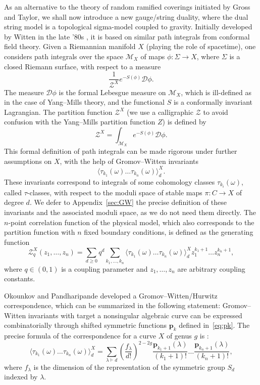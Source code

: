 \documentclass[11pt,a4paper,reqno]{article}
\theoremstyle{definition}
\theoremstyle{remark}
\begin{document}
As an alternative to the theory of random ramified coverings initiated by Gross and Taylor, we shall now introduce a new gauge/string duality, where the dual string model is a topological sigma-model coupled to gravity. Initially developed by Witten in the late '80s \cite{Wit88,Wit91b}, it is based on similar path integrals from conformal field theory. Given a Riemannian manifold $X$ (playing the role of spacetime), one considers path integrals over the space $\mathcal{M}_X$ of maps $\phi:\Sigma\to X$, where $\Sigma$ is a closed Riemann surface, with respect to a measure
\[
\frac{1}{\mathcal{Z}^X}e^{-S(\phi)}\mathcal{D}\phi.
\]
The measure $\mathcal{D}\phi$ is the formal Lebesgue measure on $\mathcal{M}_X$, which is ill-defined as in the case of Yang--Mills theory, and the functional $S$ is a conformally invariant Lagrangian. The partition function $\mathcal{Z}^X$ (we use a calligraphic $\mathcal{Z}$ to avoid confusion with the Yang--Mills partition function $Z$) is defined by
\[
\mathcal{Z}^X=\int_{\mathcal{M}_X}e^{-S(\phi)}\mathcal{D}\phi.
\]
This formal definition of path integrals can be made rigorous under further assumptions on $X$, with the help of Gromov--Witten invariants
\[
\langle\tau_{k_1}(\omega)\ldots\tau_{k_n}(\omega)\rangle_d^X.
\]
These invariants correspond to integrals of some cohomology classes $\tau_{k_i}(\omega)$, called $\tau$-classes, with respect to the moduli space of stable maps $\pi:C\to X$ of degree $d$. We defer to Appendix~\ref{sec:GW} the precise definition of these invariants and the associated moduli space, as we do not need them directly. The $n$-point correlation function of the physical model, which also corresponds to the partition function with $n$ fixed boundary conditions, is defined as the generating function
\begin{equation}\label{eq:GW_PF}
\mathcal{Z}_q^X(z_1,\ldots,z_n)=\sum_{d\geq 0}q^d\sum_{k_1,\ldots,k_n}\langle \tau_{k_1}(\omega)\ldots\tau_{k_n}(\omega)\rangle_d^Xz_1^{k_1+1}\ldots z_n^{k_n+1},
\end{equation}
where $q\in(0,1)$ is a coupling parameter and $z_1,\ldots,z_n$ are arbitrary coupling constants.

Okounkov and Pandharipande developed a  Gromov--Witten/Hurwitz correspondence, which can be summarized in the following statement: Gromov--Witten invariants with target a nonsingular algebraic curve can be expressed combinatorially through shifted symmetric functions $\mathbf p_k$ defined in~\eqref{eq:pk}. The precise formula of the correspondence for a curve $X$ of genus $g$ is \cite[eq. (0.25)]{OP2}:
\begin{equation}\label{eq:GWH_bracket}
\langle\tau_{k_1}(\omega)\ldots\tau_{k_n}(\omega)\rangle_d^X=\sum_{\lambda\vdash d}\left(\frac{f_\lambda}{d!}\right)^{2-2g}\frac{\mathbf{p}_{k_1+1}(\lambda)}{(k_1+1)!}\ldots \frac{\mathbf{p}_{k_n+1}(\lambda)}{(k_n+1)!},
\end{equation}
where $f_\lambda$ is the dimension of the representation of the symmetric group $S_d$ indexed by $\lambda.$
\end{document}
